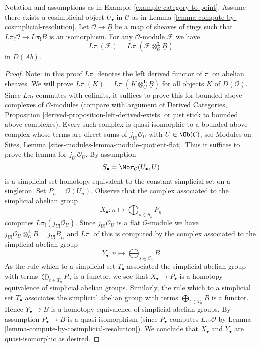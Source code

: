 \begin{lemma}
\label{lemma-O-homology-B-homology-general}
Notation and assumptions as in Example \ref{example-category-to-point}.
Assume there exists a cosimplicial object $U_\bullet$ in $\mathcal{C}$ as in
Lemma \ref{lemma-compute-by-cosimplicial-resolution}.
Let $\mathcal{O} \to \underline{B}$ be a map of sheaves of rings
such that $L\pi_!\mathcal{O} \to L\pi_!\underline{B}$ is an isomorphism.
For any $\mathcal{O}$-module $\mathcal{F}$ we have
$$
L\pi_!(\mathcal{F}) =
L\pi_!(\mathcal{F} \otimes_\mathcal{O}^\mathbf{L} \underline{B})
$$
in $D(\textit{Ab})$.
\end{lemma}

\begin{proof}
Note: in this proof $L\pi_!$ denotes the left derived functor
of $\pi_!$ on abelian sheaves. We will prove
$L\pi_!(K) = L\pi_!(K \otimes_\mathcal{O}^\mathbf{L} \underline{B})$
for all objects $K$ of $D(\mathcal{O})$.
Since $L\pi_!$ commutes with colimits, it suffices
to prove this for bounded above complexes of $\mathcal{O}$-modules
(compare with argument of
Derived Categories, Proposition \ref{derived-proposition-left-derived-exists}
or just stick to bounded above complexes).
Every such complex is quasi-isomorphic to a bounded above complex
whose terms are direct sums of $j_{U!}\mathcal{O}_U$ with
$U \in \Ob(\mathcal{C})$, see
Modules on Sites, Lemma \ref{sites-modules-lemma-module-quotient-flat}.
Thus it suffices to prove the lemma
for $j_{U!}\mathcal{O}_U$. By assumption
$$
S_\bullet = \Mor_\mathcal{C}(U_\bullet, U)
$$
is a simplicial set homotopy equivalent to the constant simplicial
set on a singleton. Set $P_n = \mathcal{O}(U_n)$.
Observe that the complex associated to the simplicial
abelian group
$$
X_\bullet : n \longmapsto \bigoplus\nolimits_{s \in S_n} P_n
$$
computes $L\pi_!(j_{U!}\mathcal{O}_U)$. Since $j_{U!}\mathcal{O}_U$ is
a flat $\mathcal{O}$-module we have
$j_{U!}\mathcal{O}_U \otimes^\mathbf{L}_\mathcal{O} \underline{B} =
j_{U!}\underline{B}_U$ and $L\pi_!$ of this is computed by the complex
associated to the simplicial abelian group
$$
Y_\bullet : n \longmapsto \bigoplus\nolimits_{s \in S_n} B
$$
As the rule which to a simplicial set $T_\bullet$ associated the simplicial
abelian group with terms $\bigoplus_{t \in T_n} P_n$ is a functor, we see
that $X_\bullet \to P_\bullet$ is a homotopy equivalence of simplicial
abelian groups. Similarly, the rule which to a simplicial set
$T_\bullet$ associates the simplicial abelian group with terms
$\bigoplus_{t \in T_n} B$ is a functor. Hence $Y_\bullet \to B$
is a homotopy equivalence of simplicial abelian groups.
By assumption $P_\bullet \to B$ is a quasi-isomorphism
(since $P_\bullet$ computes $L\pi_!\mathcal{O}$ by
Lemma \ref{lemma-compute-by-cosimplicial-resolution}).
We conclude that $X_\bullet$ and $Y_\bullet$ are quasi-isomorphic as desired.
\end{proof}






